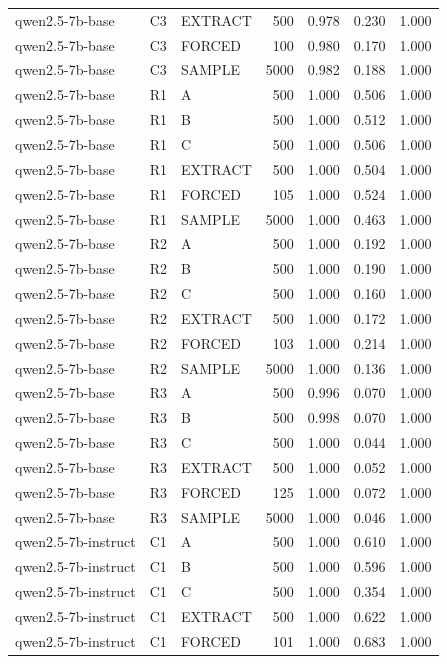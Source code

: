 \begin{table}
\begin{tabular}{lllrrrr}
qwen2.5-7b-base & C3 & EXTRACT & 500 & 0.978 & 0.230 & 1.000 \\
qwen2.5-7b-base & C3 & FORCED & 100 & 0.980 & 0.170 & 1.000 \\
qwen2.5-7b-base & C3 & SAMPLE & 5000 & 0.982 & 0.188 & 1.000 \\
qwen2.5-7b-base & R1 & A & 500 & 1.000 & 0.506 & 1.000 \\
qwen2.5-7b-base & R1 & B & 500 & 1.000 & 0.512 & 1.000 \\
qwen2.5-7b-base & R1 & C & 500 & 1.000 & 0.506 & 1.000 \\
qwen2.5-7b-base & R1 & EXTRACT & 500 & 1.000 & 0.504 & 1.000 \\
qwen2.5-7b-base & R1 & FORCED & 105 & 1.000 & 0.524 & 1.000 \\
qwen2.5-7b-base & R1 & SAMPLE & 5000 & 1.000 & 0.463 & 1.000 \\
qwen2.5-7b-base & R2 & A & 500 & 1.000 & 0.192 & 1.000 \\
qwen2.5-7b-base & R2 & B & 500 & 1.000 & 0.190 & 1.000 \\
qwen2.5-7b-base & R2 & C & 500 & 1.000 & 0.160 & 1.000 \\
qwen2.5-7b-base & R2 & EXTRACT & 500 & 1.000 & 0.172 & 1.000 \\
qwen2.5-7b-base & R2 & FORCED & 103 & 1.000 & 0.214 & 1.000 \\
qwen2.5-7b-base & R2 & SAMPLE & 5000 & 1.000 & 0.136 & 1.000 \\
qwen2.5-7b-base & R3 & A & 500 & 0.996 & 0.070 & 1.000 \\
qwen2.5-7b-base & R3 & B & 500 & 0.998 & 0.070 & 1.000 \\
qwen2.5-7b-base & R3 & C & 500 & 1.000 & 0.044 & 1.000 \\
qwen2.5-7b-base & R3 & EXTRACT & 500 & 1.000 & 0.052 & 1.000 \\
qwen2.5-7b-base & R3 & FORCED & 125 & 1.000 & 0.072 & 1.000 \\
qwen2.5-7b-base & R3 & SAMPLE & 5000 & 1.000 & 0.046 & 1.000 \\
qwen2.5-7b-instruct & C1 & A & 500 & 1.000 & 0.610 & 1.000 \\
qwen2.5-7b-instruct & C1 & B & 500 & 1.000 & 0.596 & 1.000 \\
qwen2.5-7b-instruct & C1 & C & 500 & 1.000 & 0.354 & 1.000 \\
qwen2.5-7b-instruct & C1 & EXTRACT & 500 & 1.000 & 0.622 & 1.000 \\
qwen2.5-7b-instruct & C1 & FORCED & 101 & 1.000 & 0.683 & 1.000 \\

\end{tabular}
\end{table}
